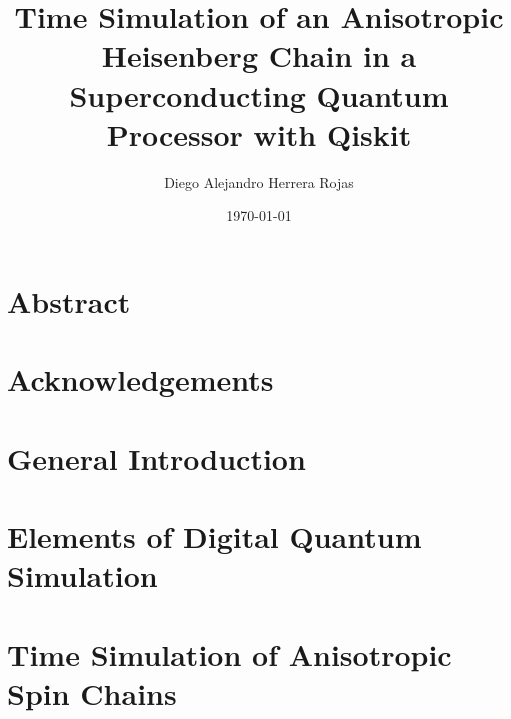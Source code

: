 \documentclass[twoside]{report}
\title{Time Simulation of an Anisotropic Heisenberg Chain in a Superconducting Quantum Processor with Qiskit}
\author{Diego Alejandro Herrera Rojas}
\date{\today}
\begin{document}
  
  \tableofcontents
  \chapter*{Abstract}
  \label{abstract}
  
  \chapter*{Acknowledgements}
  \label{ackn}
  
 \chapter{General Introduction}
 \label{chap:intro}
 
 \chapter{Elements of Digital Quantum Simulation}
 \label{chap:qc}
 
 \chapter{Time Simulation of Anisotropic Spin Chains}
 \label{chap:main}
 
\end{document}
